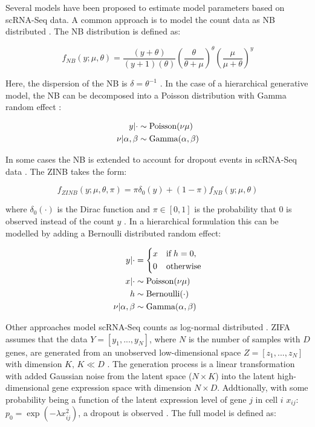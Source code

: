 Several models have been proposed to estimate model parameters based on scRNA-Seq data. A common approach is to model the count data as \gls{NB} distributed \citep{Vallejos2015BASiCS, Risso2018, Lopez2018}. The NB distribution is defined as:

\begin{equation}
f_{NB}(y;\mu,\theta)=\frac{(y+\theta)}{(y+1)(\theta)}\left(\frac{\theta}{\theta + \mu}\right)^\theta\left(\frac{\mu}{\mu + \theta}\right)^y
\end{equation}

Here, the dispersion of the NB is $\delta=\theta^{-1}$ \cite{Risso2018}. In the case of a hierarchical generative model, the NB can be decomposed into a Poisson distribution with Gamma random effect \cite{Vallejos2015BASiCS}:

\begin{align*}
y|\cdot&\sim{}\textnormal{Poisson}(\nu\mu)\\
\nu|\alpha,\beta&\sim{}\textnormal{Gamma}(\alpha,\beta)
\end{align*}

In some cases \citep{Risso2018, Lopez2018} the NB is extended to account for dropout events in scRNA-Seq data \citep{Kharchenko2015}. The \gls{ZINB} takes the form:

\begin{equation}
f_{ZINB}(y;\mu,\theta,\pi)=\pi\delta_0(y) + (1-\pi)f_{NB}(y;\mu,\theta) 
\end{equation}

where $\delta_0(\cdot)$ is the Dirac function and $\pi\in[0,1]$ is the probability that 0 is observed instead of the count $y$ \citep{Risso2018}. In a hierarchical formulation this can be modelled by adding a Bernoulli distributed random effect:

\begin{align*}
y|\cdot & = 
 \left\lbrace
  \begin{aligned}
    & x && \textnormal{if} \; h = 0,  \\ 
    & 0 && \textnormal{otherwise}    	    
  \end{aligned}
\right.\\
x|\cdot&\sim{}\textnormal{Poisson}(\nu\mu)\\
h & \sim \textnormal{Bernoulli}(\cdot)\\
\nu|\alpha,\beta&\sim{}\textnormal{Gamma}(\alpha,\beta)
\end{align*}

Other approaches model scRNA-Seq counts as log-normal distributed \citep{Azizi2017,Pierson2015}. \Gls{ZIFA} assumes that the data $Y=[y_1,...,y_N]$, where $N$ is the number of samples with $D$ genes, are generated from an unobserved low-dimensional space $Z=[z_1,...,z_N]$ with dimension $K,\,{}K\ll{}D$ \citep{Pierson2015}. The generation process is a linear transformation with added Gaussian noise from the latent space ($N\times{}K$) into the latent high-dimensional gene expression space with dimension $N\times{}D$. Addtionally, with some probability being a function of the latent expression level of gene $j$ in cell $i$ $x_{ij}$: $p_0=\exp(-\lambda{}x_{ij}^2)$, a dropout is observed \citep{Pierson2015}. The full model is defined as:

